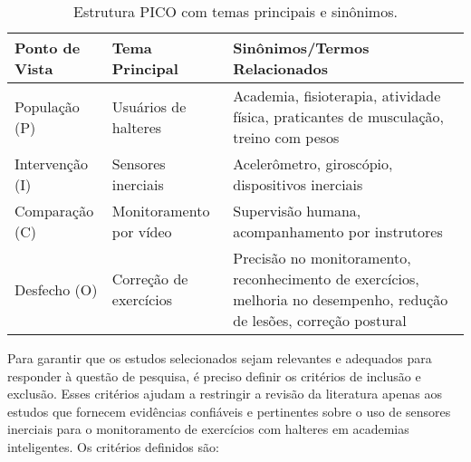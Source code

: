 \documentclass[a4paper,12pt]{article}
\begin{document}
\begin{table}[ht]
\centering
\begin{tabularx}{\textwidth}{|X|X|X|}
\hline
\textbf{Ponto de Vista} & \textbf{Tema Principal} & \textbf{Sinônimos/Termos Relacionados} \\ \hline
População (P)           & Usuários de halteres    & Academia, fisioterapia, atividade física, praticantes de musculação, treino com pesos \\ \hline
Intervenção (I)         & Sensores inerciais      & Acelerômetro, giroscópio, dispositivos inerciais \\ \hline
Comparação (C)          & Monitoramento por vídeo    & Supervisão humana, acompanhamento por instrutores \\ \hline
Desfecho (O)            & Correção de exercícios  & Precisão no monitoramento, reconhecimento de exercícios, melhoria no desempenho, redução de lesões, correção postural \\ \hline
\end{tabularx}
\caption{Estrutura PICO com temas principais e sinônimos.}
\label{tab:PICO}
\end{table}

Para garantir que os estudos selecionados sejam relevantes e adequados para responder à questão de pesquisa, é preciso definir os critérios de inclusão e exclusão. Esses critérios ajudam a restringir a revisão da literatura apenas aos estudos que fornecem evidências confiáveis e pertinentes sobre o uso de sensores inerciais para o monitoramento de exercícios com halteres em academias inteligentes.
\newpage
Os critérios definidos são:
\end{document}
